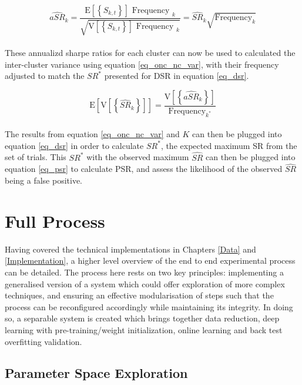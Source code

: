 \documentclass[a4paper,11pt,oneside]{article}
\theoremstyle{plain}
\theoremstyle{definition}
\begin{document}
	\begin{equation}\label{eq_asr}
	\widehat{a S R}_{k}=\frac{\mathrm{E}\left[\left\{S_{k, t}\right\}\right] \text { Frequency }_{k}}{\sqrt{\mathrm{V}\left[\left\{S_{k, t}\right\}\right] \text { Frequency }_{k}}}=\widehat{S R}_{k} \sqrt{\text {Frequency}_{k}}
	\end{equation}
	~\\
	These annualizd sharpe ratios for each cluster can now be used to calculated the inter-cluster variance using equation \ref{eq_onc_nc_var}, with their frequency adjusted to match the $SR^*$ presented for DSR in equation \ref{eq_dsr}. 
		
	\begin{equation}\label{eq_onc_nc_var}
	\mathrm{E}\left[\mathrm{V}\left[\left\{\widehat{S R}_{k}\right\}\right]\right]=\frac{\mathrm{V}\left[\left\{\widehat{a S R}_{k}\right\}\right]}{\text {Frequency}_{k^{*}}}
	\end{equation}
	~\\
	The results from equation \ref{eq_onc_nc_var} and $K$ can then be plugged into equation \ref{eq_dsr} in order to calculate $SR^*$, the expected maximum SR from the set of trials. This $SR^*$ with the observed maximum $\widehat{SR}$ can then be plugged into equation \ref{eq_psr} to calculate PSR, and assess the likelihood of the observed $\widehat{SR}$ being a false positive.
		
		
		
	\newpage
	\section{Full Process}\label{imp_proc}
	
	Having covered the technical implementations in Chapters \ref{Data} and \ref{Implementation}, a higher level overview of the end to end experimental process can be detailed. The process here rests on two key principles: implementing a generalised version of a system which could offer exploration of more complex techniques, and ensuring an effective modularisation of steps such that the process can be reconfigured accordingly while maintaining its integrity. In doing so, a separable system is created which brings together data reduction, deep learning with pre-training/weight initialization, online learning and back test overfitting validation.
	
	\subsection{Parameter Space Exploration}\label{proc_parameters}
	
\end{document}
